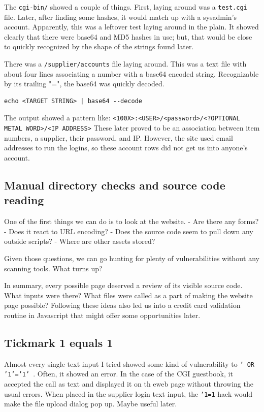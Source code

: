 The \texttt{cgi-bin/} showed a couple of things.  First, laying around was a \texttt{test.cgi} file.  Later, after finding some hashes, it would match up with a sysadmin's account.  Apparently, this was a leftover test laying around in the plain.  It showed clearly that there were base64 and MD5 hashes in use; but, that would be close to quickly recognized by the shape of the strings found later.

There was a \texttt{/supplier/accounts} file laying around.  This was a text file with about four lines associating a number with a base64 encoded string.  Recognizable by its trailing "=", the base64 was quickly decoded.  

\begin{lstlisting}
echo <TARGET STRING> | base64 --decode
\end{lstlisting}

The output showed a pattern like:
\texttt{<100X>:<USER>/<\gls{password}>/<?OPTIONAL METAL WORD>/<IP ADDRESS>}
These later proved to be an association between item numbers, a supplier, their password, and IP.  However, the site used email addresses to run the logins, so these account rows did not get us into anyone's account.

\subsection{Manual directory checks and source code reading}
One of the first things we can do is to look at the website.  
- Are there any forms?  
- Does it react to URL encoding?  
- Does the source code seem to pull down any outside scripts?  
- Where are other assets stored?  

Given those questions, we can go hunting for plenty of vulnerabilities without any scanning tools.  What turns up?

In summary, every possible page deserved a review of its visible source code.  What inputs were there?  What files were called as a part of making the website page possible?  Following these ideas also led us into a credit card validation routine in Javascript that might offer some opportunities later.

\subsection{Tickmark 1 equals 1}

Almost every single text input I tried showed some kind of vulnerability to \texttt{' OR '1'='1' }.  Often, it showed an error.  In the case of the CGI guestbook, it accepted the call as text and displayed it on th eweb page without throwing the usual errors.  When placed in the supplier login text input, the \texttt{'1=1} hack would make the file upload dialog pop up.  Maybe useful later.

